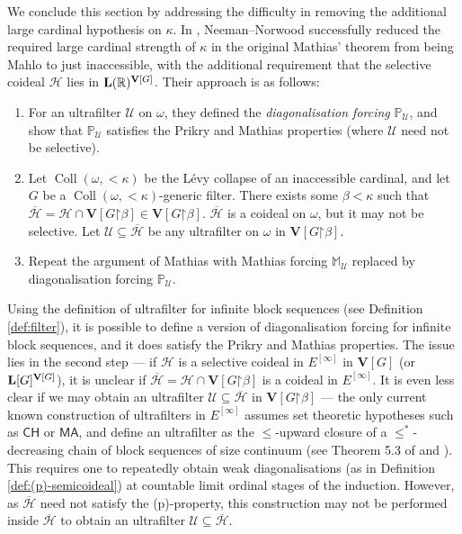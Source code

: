 \documentclass[11pt,reqno]{amsart}
\theoremstyle{plain}
\numberwithin{equation}{section}
\theoremstyle{definition}
\newcommand{\func}{\operatorname}
\newcommand{\R}{\mathbb{R}}
\renewcommand{\P}{\mathbb{P}}
\renewcommand{\bar}[1]{\overline{#1}}
\newcommand{\cal}{\mathcal}
\renewcommand{\bf}{\mathbf}
\newcommand{\CH}{\mathsf{CH}}
\newcommand{\MA}{\mathsf{MA}}
\newcommand{\restrictedto}{\mathord{\upharpoonright}}
\newcommand{\Coll}{\func{Coll}}
\newcommand{\U}{\cal{U}}
\newcommand{\V}{\bf{V}}
\renewcommand{\H}{\cal{H}}
\let\strokeL\L
\DeclareRobustCommand{\L}{\ifmmode\mathbf{L}\else\strokeL\fi}
\begin{document}
We conclude this section by addressing the difficulty in removing the additional large cardinal hypothesis on $\kappa$. In \cite{NN18}, Neeman--Norwood successfully reduced the required large cardinal strength of $\kappa$ in the original Mathias' theorem \cite{M77} from being Mahlo to just inaccessible, with the additional requirement that the selective coideal $\H$ lies in $\L(\R)^{\V[G]}$. Their approach is as follows:
\begin{enumerate}
    \item For an ultrafilter $\U$ on $\omega$, they defined the \emph{diagonalisation forcing} $\P_\U$, and show that $\P_\U$ satisfies the Prikry and Mathias properties (where $\U$ need not be selective).
    
    \item Let $\Coll(\omega,<\!\kappa)$ be the L\'{e}vy collapse of an inaccessible cardinal, and let $G$ be a $\Coll(\omega,<\!\kappa)$-generic filter. There exists some $\beta < \kappa$ such that $\bar{\H} = \H \cap \V[G\restrictedto\beta] \in \V[G\restrictedto\beta]$. $\bar{\H}$ is a coideal on $\omega$, but it may not be selective. Let $\U \subseteq \bar{\H}$ be any ultrafilter on $\omega$ in $\V[G\restrictedto\beta]$.
    
    \item Repeat the argument of Mathias with Mathias forcing $\mathbb{M}_\U$ replaced by diagonalisation forcing $\P_\U$.
\end{enumerate}
Using the definition of ultrafilter for infinite block sequences (see Definition \ref{def:filter}), it is possible to define a version of diagonalisation forcing for infinite block sequences, and it does satisfy the Prikry and Mathias properties. The issue lies in the second step --- if $\H$ is a selective coideal in $E^{[\infty]}$ in $\V[G]$ (or $\L[G]^{\V[G]}$), it is unclear if $\bar{\H} = \H \cap \V[G\restrictedto\beta]$ is a coideal in $E^{[\infty]}$. It is even less clear if we may obtain an ultrafilter $\U \subseteq \bar{\H}$ in $\V[G\restrictedto\beta]$ --- the only current known construction of ultrafilters in $E^{[\infty]}$ assumes set theoretic hypotheses such as $\CH$ or $\MA$, and define an ultrafilter as the $\leq$-upward closure of a $\leq^*$-decreasing chain of block sequences of size continuum (see Theorem 5.3 of \cite{S18} and \cite{B87}). This requires one to repeatedly obtain weak diagonalisations (as in Definition \ref{def:(p)-semicoideal}) at countable limit ordinal stages of the induction. However, as $\bar{\H}$ need not satisfy the (p)-property, this construction may not be performed inside $\bar{\H}$ to obtain an ultrafilter $\U \subseteq \bar{\H}$. 
\end{document}
